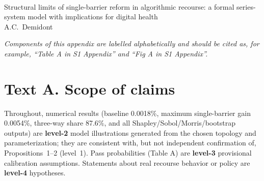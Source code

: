 \documentclass[10pt,letterpaper]{article}
\begin{document}
\vspace*{0.2in}
\begin{flushleft}
{\Large \textbf{}}\newline\\
Structural limits of single-barrier reform in algorithmic recourse: a formal series-system model with implications for digital health\\
\medskip A.C.\ Demidont
\end{flushleft}
\bigskip
\noindent\textit{Components of this appendix are labelled alphabetically and should be cited as, for example, ``Table A in S1 Appendix'' and ``Fig A in S1 Appendix''.}

\tableofcontents
\newpage

\section*{Text A. Scope of claims}
Throughout, numerical results (baseline 0.0018\%, maximum single-barrier gain 0.0054\%, three-way share 87.6\%, and all Shapley/Sobol/Morris/bootstrap outputs) are \textbf{level-2} model illustrations generated from the chosen topology and parameterization; they are consistent with, but not independent confirmation of, Propositions~1--2 (level~1). Pass probabilities (Table A) are \textbf{level-3} provisional calibration assumptions. Statements about real recourse behavior or policy are \textbf{level-4} hypotheses.
\end{document}
